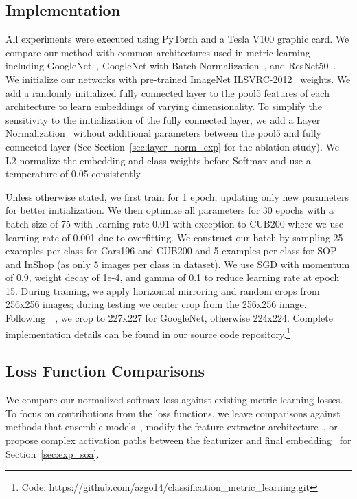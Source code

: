\documentclass{bmvc2k}
\begin{document}
\subsection{Implementation}

All experiments were executed using PyTorch and a Tesla V100 graphic card. We compare our method with common architectures used in metric learning including GoogleNet~\cite{googlenet2014}, GoogleNet with Batch Normalization~\cite{batchnorm}, and ResNet50~\cite{kaiming16}. We initialize our networks with pre-trained ImageNet ILSVRC-2012~\cite{imagenet_cvpr09} weights. We add a randomly initialized fully connected layer to the pool5 features of each architecture to learn embeddings of varying dimensionality. To simplify the sensitivity to the initialization of the fully connected layer, we add a Layer Normalization~\cite{layernorm} without additional parameters between the pool5 and fully connected layer (See Section~\ref{sec:layer_norm_exp} for the ablation study). We L2 normalize the embedding and class weights before Softmax and use a temperature of 0.05 consistently.

Unless otherwise stated, we first train for 1 epoch, updating only new parameters for better initialization. We then optimize all parameters for 30 epochs with a batch size of 75 with learning rate 0.01 with exception to CUB200 where we use learning rate of 0.001 due to overfitting. We construct our batch by sampling 25 examples per class for Cars196 and CUB200 and 5 examples per class for SOP and InShop (as only  5 images per class in dataset). We use SGD with momentum of 0.9, weight decay of 1e-4, and gamma of 0.1 to reduce learning rate at epoch 15. During training, we apply horizontal mirroring and random crops from 256x256 images; during testing we center crop from the 256x256 image. Following~\cite{angular}~\cite{nofusslearning}, we crop to 227x227 for GoogleNet, otherwise 224x224. Complete implementation details can be found in our source code repository.\footnote{Code: https://github.com/azgo14/classification\_metric\_learning.git}


\subsection{Loss Function Comparisons}

We compare our normalized softmax loss against existing metric learning losses. To focus on contributions from the loss functions, we leave comparisons against methods that ensemble models~\cite{yuan2016HDC, Xuan2018DeepRE}, modify the feature extractor architecture~\cite{attention_metric}, or propose complex activation paths between the featurizer and final embedding~\cite{abier} for Section~\ref{sec:exp_soa}.
\end{document}
